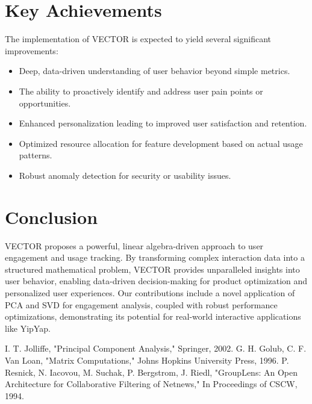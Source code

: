 \documentclass[10pt]{article}
\begin{document}
\section{Key Achievements}
The implementation of VECTOR is expected to yield several significant improvements:
\begin{itemize}
    \item Deep, data-driven understanding of user behavior beyond simple metrics.
    \item The ability to proactively identify and address user pain points or opportunities.
    \item Enhanced personalization leading to improved user satisfaction and retention.
    \item Optimized resource allocation for feature development based on actual usage patterns.
    \item Robust anomaly detection for security or usability issues.
\end{itemize}

\section{Conclusion}
VECTOR proposes a powerful, linear algebra-driven approach to user engagement and usage tracking. By transforming complex interaction data into a structured mathematical problem, VECTOR provides unparalleled insights into user behavior, enabling data-driven decision-making for product optimization and personalized user experiences. Our contributions include a novel application of PCA and SVD for engagement analysis, coupled with robust performance optimizations, demonstrating its potential for real-world interactive applications like YipYap.


\begin{thebibliography}{99}
 I. T. Jolliffe, "Principal Component Analysis," Springer, 2002.
 G. H. Golub, C. F. Van Loan, "Matrix Computations," Johns Hopkins University Press, 1996.
 P. Resnick, N. Iacovou, M. Suchak, P. Bergstrom, J. Riedl, "GroupLens: An Open Architecture for Collaborative Filtering of Netnews," In Proceedings of CSCW, 1994.
\end{thebibliography}
\end{document}
